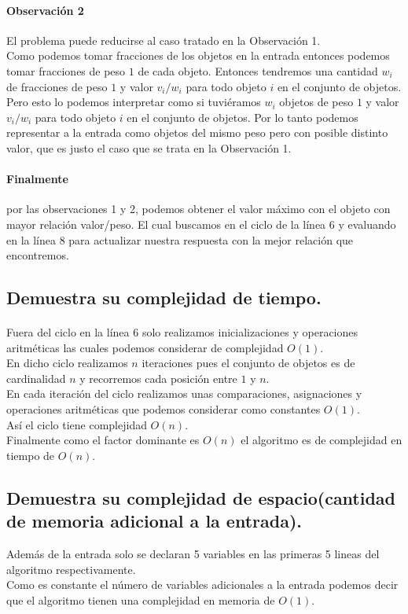 \documentclass[12pt]{article}
\begin{document}
\paragraph{Observación 2} El problema puede reducirse al caso tratado en la Observación 1.\\
Como podemos tomar fracciones de los objetos en la entrada entonces podemos tomar fracciones de peso $1$ de cada objeto. Entonces tendremos una cantidad $w_i$ de fracciones de peso $1$ y valor $v_i/w_i$ para todo objeto $i$ en el conjunto de objetos. Pero esto lo podemos interpretar como si tuviéramos $w_i$ objetos de peso $1$ y valor $v_i/w_i$ para todo objeto $i$ en el conjunto de objetos. Por lo tanto podemos representar a la entrada como objetos del mismo peso pero con posible distinto valor, que es justo el caso que se trata en la Observación 1.
\paragraph{Finalmente} por las observaciones 1 y 2, podemos obtener el valor máximo con el objeto con mayor relación valor/peso. El cual buscamos en el ciclo de la línea 6 y evaluando en la línea 8 para actualizar nuestra respuesta con la mejor relación que encontremos.
 \subsection{Demuestra su complejidad de tiempo.}
 \paragraph{} Fuera del ciclo en la línea 6 solo realizamos inicializaciones y operaciones aritméticas las cuales podemos considerar de complejidad $O(1)$.\\
 En dicho ciclo realizamos $n$ iteraciones pues el conjunto de objetos es de cardinalidad $n$ y recorremos cada posición entre $1$ y $n$. \\ 
 En cada iteración  del ciclo realizamos unas comparaciones, asignaciones y operaciones aritméticas que podemos considerar como constantes $O(1)$.\\
 Así el ciclo tiene complejidad $O(n)$.\\
 Finalmente como el factor dominante es $O(n)$ el algoritmo es de complejidad en tiempo de $O(n)$.
 \subsection{Demuestra su complejidad de espacio(cantidad de memoria adicional a la entrada).}
 Además de la entrada solo se declaran 5 variables en las primeras 5 lineas del algoritmo respectivamente.\\
 Como es constante el número de variables adicionales a la entrada podemos decir que el algoritmo tienen una complejidad en memoria de $O(1)$.
\end{document}
